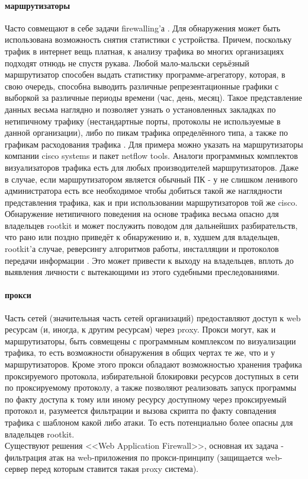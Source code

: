 \paragraph{маршрутизаторы\\}
 Часто совмещают в себе задачи firewalling'а . Для обнаружения может
быть использована возможность снятия статистики с устройства. Причем,
поскольку трафик в интернет вещь платная, к анализу трафика во многих
организациях подходят отнюдь не спустя рукава. Любой мало-мальски
серьёзный маршрутизатор способен выдать статистику программе-агрегатору,
которая, в свою очередь, способна выводить различные репрезентационные
графики с выборкой за различные периоды времени (час, день, месяц).
Такое представление данных весьма наглядно и позволяет узнать о
установленных закладках по нетипичному трафику (нестандартные порты,
протоколы не используемые в данной организации), либо по пикам трафика
определённого типа, а также по графикам расходования трафика .
Для примера можно указать на маршрутизаторы компании cisco systems и
пакет netflow tools. Аналоги программных комплектов визуализаторов
трафика есть для любых производителей маршрутизаторов. Даже в случае,
если маршрутизатором является обычный ПК - у не слишком ленивого
администратора есть все необходимое чтобы добиться такой же наглядности
 представления трафика, как и при использовании маршрутизаторов той же
 cisco. \\

Обнаружение нетипичного поведения на основе трафика весьма опасно для
владельцев rootkit и может послужить поводом для дальнейших
разбирательств, что рано или поздно приведёт к обнаружению и, в, худшем
для владельцев, rootkit'а случае, реверсингу алгоритмов работы,
инсталляции и протоколов передачи информации . Это может привести
к выходу на владельцев, вплоть до выявления личности с вытекающими
из этого судебными преследованиями.

\paragraph{прокси\\}
Часть сетей (значительная часть сетей организаций) предоставляют доступ
к web ресурсам (и, иногда, к другим ресурсам) через proxy. Прокси
могут, как и маршрутизаторы, быть совмещены с программным комплексом по
визуализации трафика, то есть возможности обнаружения в общих чертах те
же, что и у маршрутизаторов. Кроме этого прокси обладают возможностью
хранения трафика проксируемого протокола, избирательной блокировки
ресурсов доступных в сети по проксируемому протоколу, а также позволяют
реализовать запуск программы по факту доступа к тому или иному ресурсу
доступному через проксируемый протокол и, разумеется фильтрации и вызова
скрипта по факту совпадения трафика с шаблоном какой либо атаки. То есть
потенциально более опасны для владельцев rootkit.\\
Существуют решения <<Web Application Firewall>>, основная их задача -
фильтрация атак на web-приложения по прокси-принципу (защищается web-сервер
перед которым ставится такая proxy система).

